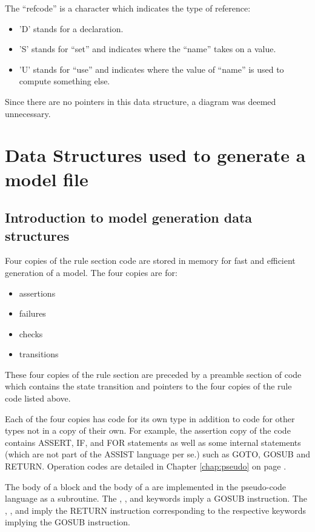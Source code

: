 The ``refcode'' is a character which indicates the type of reference:
\begin{itemize}
\item 'D' stands for a declaration.
\item 'S' stands for ``set'' and indicates where the ``name'' takes on a value.
\item 'U' stands for ``use'' and indicates where the value of ``name'' is
      used to compute something else.
\end{itemize}

Since there are no pointers in this data structure, a diagram was deemed
unnecessary.


\section{Data Structures used to generate a model file}
\label{chap:ruledata}

\subsection{Introduction to model generation data structures}
\label{sec:codeintro}

Four copies of the rule section code are stored in memory for fast and 
efficient generation of a model.   The four copies are for:
\begin{itemize}
\item {} assertions
\item {} failures
\item {} checks
\item {} transitions
\end{itemize}
These four copies of the rule section are preceded by a preamble section of
code which contains the  state transition and pointers to the
four copies of the rule code listed above.

Each of the four copies has code for its own type in addition to code for
other types not in a copy of their own.   For example, the assertion
copy of the code contains ASSERT, IF, and FOR statements as well as some
internal statements (which are not part of the ASSIST language per se.)
such as GOTO, GOSUB and RETURN.   Operation codes are detailed in Chapter
\ref{chap:pseudo} on page \pageref{chap:pseudo}.

The body of a block  and the body of a  are implemented
in the pseudo-code language as a subroutine.  The , , and
 keywords imply a GOSUB instruction.   The , , and
 imply the RETURN instruction corresponding to the respective
keywords implying the GOSUB instruction.

